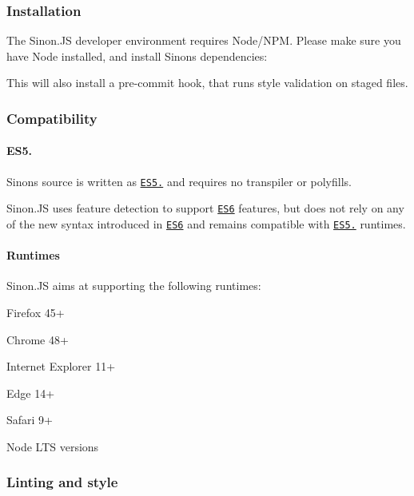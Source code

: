 \subsubsection*{Installation}

The Sinon.\+JS developer environment requires Node/\+N\+PM. Please make sure you have Node installed, and install Sinon\textquotesingle{}s dependencies\+: 


This will also install a pre-\/commit hook, that runs style validation on staged files.

\subsubsection*{Compatibility}

\paragraph*{E\+S5.}

Sinon\textquotesingle{}s source is written as \href{http://www.ecma-international.org/ecma-262/5.1/}{\tt E\+S5.} and requires no transpiler or polyfills.

Sinon.\+JS uses feature detection to support \href{http://www.ecma-international.org/ecma-262/6.0/}{\tt E\+S6} features, but does not rely on any of the new syntax introduced in \href{http://www.ecma-international.org/ecma-262/6.0/}{\tt E\+S6} and remains compatible with \href{http://www.ecma-international.org/ecma-262/5.1/}{\tt E\+S5.} runtimes.

\paragraph*{Runtimes}

Sinon.\+JS aims at supporting the following runtimes\+:


\begin{DoxyItemize}
\item Firefox 45+
\item Chrome 48+
\item Internet Explorer 11+
\item Edge 14+
\item Safari 9+
\item Node L\+TS versions
\end{DoxyItemize}

\subsubsection*{Linting and style}

